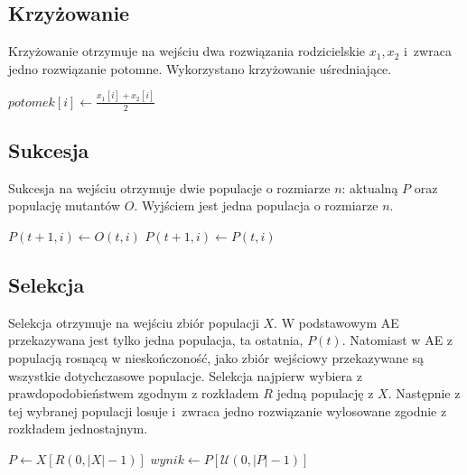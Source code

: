 \documentclass[12pt, a4paper]{article}
\begin{document}
\subsection{Krzyżowanie}

Krzyżowanie otrzymuje na wejściu dwa rozwiązania rodzicielskie $x_1,x_2$ i~zwraca jedno rozwiązanie potomne. 
Wykorzystano krzyżowanie uśredniające.

\begin{algorithm}[!htb]
\begin{algorithmic}[1]
    \State $potomek[i] \gets \frac{x_1[i] + x_2[i]}{2}$
  \EndFor
\EndFunction
\end{algorithmic}
\end{algorithm}

\subsection{Sukcesja}

Sukcesja na wejściu otrzymuje dwie populacje o rozmiarze $n$: aktualną $P$ oraz populację mutantów $O$.
Wyjściem jest jedna populacja o rozmiarze $n$.

\begin{algorithm}[!htb]
\begin{algorithmic}[1]
      \State $P(t+1, i) \gets O(t, i)$
    \Else
      \State $P(t+1, i) \gets P(t, i)$
    \EndIf
  \EndFor
\EndFunction
\end{algorithmic}
\end{algorithm}

\subsection{Selekcja}

Selekcja otrzymuje na wejściu zbiór populacji $X$. W podstawowym AE przekazywana jest tylko jedna populacja, ta ostatnia, $P(t)$.
Natomiast w AE z populacją rosnącą w nieskończoność, jako zbiór wejściowy przekazywane są wszystkie dotychczasowe populacje.
Selekcja najpierw wybiera z prawdopodobieństwem zgodnym z rozkładem $R$ jedną populację z $X$. Następnie z tej wybranej populacji 
losuje i~zwraca jedno rozwiązanie wylosowane zgodnie z rozkładem jednostajnym.

\begin{algorithm}[!htb]
\begin{algorithmic}[1]
  \State $P \gets X[R(0, |X| - 1)]$
  \State $wynik \gets P[\mathcal{U}(0, |P| - 1)]$
\EndFunction
\end{algorithmic}
\end{algorithm}
\end{document}

